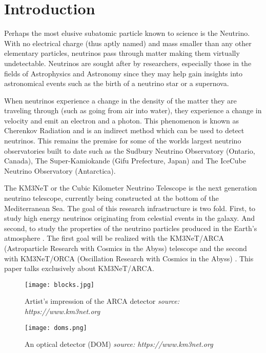 
\chapter{Introduction}
\label{cha:intro}

Perhaps the most elusive subatomic particle known to science is the
Neutrino. With no electrical charge (thus aptly named) and mass
smaller than any other elementary particles, neutrinos pass through
matter making them virtually undetectable. Neutrinos are sought after
by researchers, especially those in the fields of Astrophysics and
Astronomy since they may help gain insights into astronomical events
such as the birth of a neutrino star or a supernova.

When neutrinos experience a change in the density of the matter they
are traveling through (such as going from air into water), they
experience a change in velocity and emit an electron and a photon.
This phenomenon is known as Cherenkov Radiation
\cite{margiotta2014km3net} and is an indirect method which can be used
to detect neutrinos. This remains the premise for some of the worlds
largest neutrino observatories built to date such as the Sudbury
Neutrino Observatory (Ontario, Canada), The Super-Kamiokande (Gifu
Prefecture, Japan) and The IceCube Neutrino Observatory (Antarctica).

The KM3NeT or the Cubic Kilometer Neutrino Telescope is the next
generation neutrino telescope, currently being constructed at the
bottom of the Mediterranean Sea. The goal of this research
infrastructure is two fold. First, to study high energy neutrinos
originating from celestial events in the galaxy. And second, to study
the properties of the neutrino particles produced in the Earth's
atmosphere \cite{adrian2016letter}. The first goal will be realized
with the KM3NeT/ARCA (Astroparticle Research with Cosmics in the
Abyss) telescope and the second with KM3NeT/ORCA (Oscillation Research
with Cosmics in the Abyss) \cite{adrian2016letter}. This paper talks
exclusively about KM3NeT/ARCA.

\begin{figure}[htb]
  \centering
  \begin{minipage}{0.74\textwidth}
    \texttt{[image: blocks.jpg]}
    \caption{Artist's impression of the ARCA detector \textit{source: https://www.km3net.org}}%
    \label{fig:blocks}    
  \end{minipage}
  \begin{minipage}{0.24\textwidth}
    \texttt{[image: doms.png]}
    \caption{An optical detector (DOM) \textit{source: https://www.km3net.org}}%
    \label{fig:doms}    
  \end{minipage}
\end{figure}


